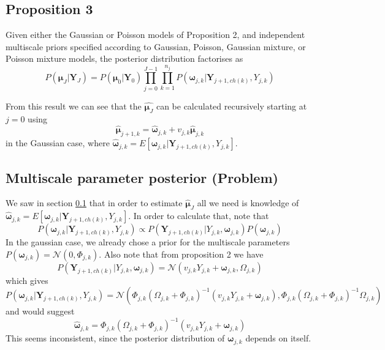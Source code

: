 \documentclass[a4paper,12pt]{article}
\theoremstyle{definition}
\begin{document}
\subsection{Proposition 3}\label{sec:prop3}
Given either the Gaussian or Poisson models of Proposition 2, and independent multiscale priors specified according to Gaussian, Poisson, Gaussian mixture, or Poisson mixture models, the posterior distribution factorises as
\begin{equation}
  P(\boldsymbol{\mu}_J | \mathbf{Y}_J) = P(\boldsymbol{\mu}_0 | \mathbf{Y}_0) \prod_{j=0}^{J-1} \prod_{k=1}^{n_j} P(\boldsymbol{\omega}_{j,k} | \mathbf{Y}_{j+1,ch(k)}, Y_{j,k})
\end{equation}

From this result we can see that the $\hat{\boldsymbol{\mu}_J}$ can be calculated recursively starting at $j=0$ using
\begin{equation}
  \hat{\boldsymbol{\mu}}_{j+1,k} = \hat{\boldsymbol{\omega}}_{j,k} + v_{j,k}\hat{\boldsymbol{\mu}}_{j,k}
\end{equation}
in the Gaussian case, where $\hat{\boldsymbol{\omega}}_{j,k} = E[\boldsymbol{\omega}_{j,k} | \mathbf{Y}_{j+1, ch(k)}, Y_{j,k}]$.

\subsection{Multiscale parameter posterior (Problem)}
We saw in section \ref{sec:prop3} that in order to estimate $\hat{\boldsymbol{\mu}}_J$ all we need is knowledge of $\hat{\boldsymbol{\omega}}_{j,k} = E[\boldsymbol{\omega}_{j,k} | \mathbf{Y}_{j+1, ch(k)}, Y_{j,k}]$. In order to calculate that, note that
\begin{equation}
  P(\boldsymbol{\omega}_{j,k} | \mathbf{Y}_{j+1, ch(k)}, Y_{j,k}) \propto P(\mathbf{Y}_{j+1, ch(k)} | Y_{j,k}, \boldsymbol{\omega}_{j,k}) P(\boldsymbol{\omega}_{j,k})
\end{equation}
In the gaussian case, we already chose a prior for the multiscale parameters $P(\boldsymbol{\omega}_{j,k}) = \mathcal{N}(0, \Phi_{j,k})$. Also note that from proposition 2 we have
\begin{equation}
  P(\mathbf{Y}_{j+1, ch(k)} | Y_{j,k}, \boldsymbol{\omega}_{j,k}) = \mathcal{N}(v_{j,k}Y_{j,k} + \boldsymbol{\omega}_{j,k}, \Omega_{j,k})
\end{equation}
which gives
\begin{equation}
  P(\boldsymbol{\omega}_{j,k} | \mathbf{Y}_{j+1, ch(k)}, Y_{j,k}) = \mathcal{N}(\Phi_{j,k}(\Omega_{j,k} + \Phi_{j,k})^{-1}(v_{j,k}Y_{j,k} + \boldsymbol{\omega}_{j,k}), \Phi_{j,k}(\Omega_{j,k} + \Phi_{j,k})^{-1} \Omega_{j,k})
\end{equation}
and would suggest
\begin{equation}\label{eq:my_omega_hat}
  \hat{\boldsymbol{\omega}}_{j,k} = \Phi_{j,k}(\Omega_{j,k} + \Phi_{j,k})^{-1}(v_{j,k}Y_{j,k} + \boldsymbol{\omega}_{j,k})
\end{equation}
This seems inconsistent, since the posterior distribution of $\boldsymbol{\omega}_{j,k}$ depends on itself.
\end{document}
